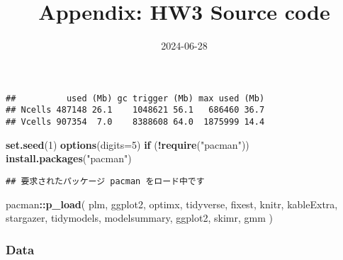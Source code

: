 \documentclass[
]{article}
\title{Appendix: HW3 Source code}
\author{}
\date{\vspace{-2.5em}2024-06-28}
\newenvironment{Shaded}{\begin{snugshade}}{\end{snugshade}}
\newcommand{\AttributeTok}[1]{\textcolor[rgb]{0.13,0.29,0.53}{#1}}
\newcommand{\ConstantTok}[1]{\textcolor[rgb]{0.56,0.35,0.01}{#1}}
\newcommand{\ControlFlowTok}[1]{\textcolor[rgb]{0.13,0.29,0.53}{\textbf{#1}}}
\newcommand{\DecValTok}[1]{\textcolor[rgb]{0.00,0.00,0.81}{#1}}
\newcommand{\FunctionTok}[1]{\textcolor[rgb]{0.13,0.29,0.53}{\textbf{#1}}}
\newcommand{\NormalTok}[1]{#1}
\newcommand{\SpecialCharTok}[1]{\textcolor[rgb]{0.81,0.36,0.00}{\textbf{#1}}}
\newcommand{\StringTok}[1]{\textcolor[rgb]{0.31,0.60,0.02}{#1}}
\begin{document}
\maketitle

\begin{Shaded}
\end{Shaded}

\begin{verbatim}
##          used (Mb) gc trigger (Mb) max used (Mb)
## Ncells 487148 26.1    1048621 56.1   686460 36.7
## Vcells 907354  7.0    8388608 64.0  1875999 14.4
\end{verbatim}

\begin{Shaded}
\begin{Highlighting}[]
\FunctionTok{set.seed}\NormalTok{(}\DecValTok{1}\NormalTok{)}
\FunctionTok{options}\NormalTok{(}\AttributeTok{digits=}\DecValTok{5}\NormalTok{) }
\ControlFlowTok{if}\NormalTok{ (}\SpecialCharTok{!}\FunctionTok{require}\NormalTok{(}\StringTok{"pacman"}\NormalTok{)) }\FunctionTok{install.packages}\NormalTok{(}\StringTok{"pacman"}\NormalTok{)}
\end{Highlighting}
\end{Shaded}

\begin{verbatim}
## 要求されたパッケージ pacman をロード中です
\end{verbatim}

\begin{Shaded}
\begin{Highlighting}[]
\NormalTok{pacman}\SpecialCharTok{::}\FunctionTok{p\_load}\NormalTok{(}
\NormalTok{  plm,}
\NormalTok{  ggplot2,}
\NormalTok{  optimx,}
\NormalTok{  tidyverse,}
\NormalTok{  fixest,}
\NormalTok{  knitr,}
\NormalTok{  kableExtra,}
\NormalTok{  stargazer,}
\NormalTok{  tidymodels,}
\NormalTok{  modelsummary,}
\NormalTok{  ggplot2,}
\NormalTok{  skimr,}
\NormalTok{  gmm}
\NormalTok{)}
\end{Highlighting}
\end{Shaded}

\hypertarget{data}{%
\subsubsection{Data}\label{data}}
\end{document}
